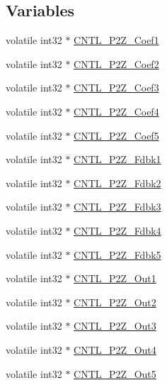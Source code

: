 \subsection*{Variables}
\begin{DoxyCompactItemize}
\item 
volatile int32 $\ast$ \hyperlink{a00010_a047c759a71b80d8cfd5e6f52b1b021b9}{C\-N\-T\-L\-\_\-P2\-Z\-\_\-\-Coef1}
\item 
volatile int32 $\ast$ \hyperlink{a00010_abdc599cbabc62898c49926678c3327e6}{C\-N\-T\-L\-\_\-P2\-Z\-\_\-\-Coef2}
\item 
volatile int32 $\ast$ \hyperlink{a00010_a1e357d296e76299ea04d7a63e4c46d1b}{C\-N\-T\-L\-\_\-P2\-Z\-\_\-\-Coef3}
\item 
volatile int32 $\ast$ \hyperlink{a00010_afe468cb1e995b267671e88b8d292aef6}{C\-N\-T\-L\-\_\-P2\-Z\-\_\-\-Coef4}
\item 
volatile int32 $\ast$ \hyperlink{a00010_a5fe3f4dd6aac27512c9e0b6fc843b0b6}{C\-N\-T\-L\-\_\-P2\-Z\-\_\-\-Coef5}
\item 
volatile int32 $\ast$ \hyperlink{a00010_a9c0418a780375035750c3d4dc16f3ae4}{C\-N\-T\-L\-\_\-P2\-Z\-\_\-\-Fdbk1}
\item 
volatile int32 $\ast$ \hyperlink{a00010_a6092ef1c1c54802bb5e11564f782390d}{C\-N\-T\-L\-\_\-P2\-Z\-\_\-\-Fdbk2}
\item 
volatile int32 $\ast$ \hyperlink{a00010_a939782d23ddbf7f45e5e393a65bafcff}{C\-N\-T\-L\-\_\-P2\-Z\-\_\-\-Fdbk3}
\item 
volatile int32 $\ast$ \hyperlink{a00010_a6937e965f3ae840ea6ee43cce410680f}{C\-N\-T\-L\-\_\-P2\-Z\-\_\-\-Fdbk4}
\item 
volatile int32 $\ast$ \hyperlink{a00010_af5cbb635f31bbebd041e8543deb40dee}{C\-N\-T\-L\-\_\-P2\-Z\-\_\-\-Fdbk5}
\item 
volatile int32 $\ast$ \hyperlink{a00010_a84d7c096ca668d1edc5e4fa54abe5d98}{C\-N\-T\-L\-\_\-P2\-Z\-\_\-\-Out1}
\item 
volatile int32 $\ast$ \hyperlink{a00010_ae6679b66ffeca93742f973a2c947855f}{C\-N\-T\-L\-\_\-P2\-Z\-\_\-\-Out2}
\item 
volatile int32 $\ast$ \hyperlink{a00010_a11dcb9f6b6d03fe960ddf790e1ad5ed2}{C\-N\-T\-L\-\_\-P2\-Z\-\_\-\-Out3}
\item 
volatile int32 $\ast$ \hyperlink{a00010_a253e4070b19470606e0566ff25fc911f}{C\-N\-T\-L\-\_\-P2\-Z\-\_\-\-Out4}
\item 
volatile int32 $\ast$ \hyperlink{a00010_a3b336a91d25a7feb9f8927b32b800d0d}{C\-N\-T\-L\-\_\-P2\-Z\-\_\-\-Out5}

\end{DoxyCompactItemize}
